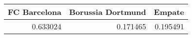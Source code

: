 \begin{tabular}{rrr}
\hline
   FC Barcelona &   Borussia Dortmund &   Empate \\
\hline
       0.633024 &            0.171465 & 0.195491 \\
\hline
\end{tabular}